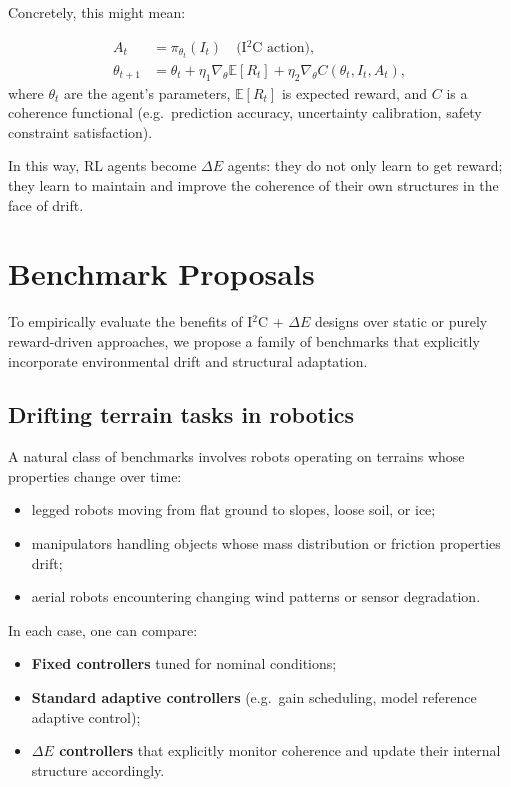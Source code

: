 \documentclass[12pt,a4paper]{report}
\begin{document}
Concretely, this might mean:

\begin{align*}
    A_t &= \pi_{\theta_t}(I_t) \quad \text{(I$^2$C action)}, \\
    \theta_{t+1} &= \theta_t + \eta_1 \nabla_{\theta} \mathbb{E}[R_t] 
                   + \eta_2 \nabla_{\theta} C(\theta_t, I_t, A_t),
\end{align*}
where \(\theta_t\) are the agent's parameters, \(\mathbb{E}[R_t]\) is expected reward, and \(C\) is a coherence functional (e.g.\ prediction accuracy, uncertainty calibration, safety constraint satisfaction).

In this way, RL agents become \(\Delta E\) agents: they do not only learn to get reward; they learn to maintain and improve the coherence of their own structures in the face of drift.

\section{Benchmark Proposals}

To empirically evaluate the benefits of I$^2$C + $\Delta E$ designs over static or purely reward-driven approaches, we propose a family of benchmarks that explicitly incorporate environmental drift and structural adaptation.

\subsection*{Drifting terrain tasks in robotics}

A natural class of benchmarks involves robots operating on terrains whose properties change over time:

\begin{itemize}[leftmargin=2em]
    \item legged robots moving from flat ground to slopes, loose soil, or ice;
    \item manipulators handling objects whose mass distribution or friction properties drift;
    \item aerial robots encountering changing wind patterns or sensor degradation.
\end{itemize}

In each case, one can compare:

\begin{itemize}[leftmargin=2em]
    \item \textbf{Fixed controllers} tuned for nominal conditions;
    \item \textbf{Standard adaptive controllers} (e.g.\ gain scheduling, model reference adaptive control);
    \item \textbf{$\Delta E$ controllers} that explicitly monitor coherence and update their internal structure accordingly.
\end{itemize}
\end{document}
